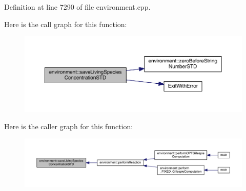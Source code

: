 Definition at line 7290 of file environment.\+cpp.



Here is the call graph for this function\+:\nopagebreak
\begin{figure}[H]
\begin{center}
\leavevmode
\includegraphics[width=350pt]{a00013_aedf8d90e1fe734948bf2213489840582_cgraph}
\end{center}
\end{figure}




Here is the caller graph for this function\+:\nopagebreak
\begin{figure}[H]
\begin{center}
\leavevmode
\includegraphics[width=350pt]{a00013_aedf8d90e1fe734948bf2213489840582_icgraph}
\end{center}
\end{figure}


